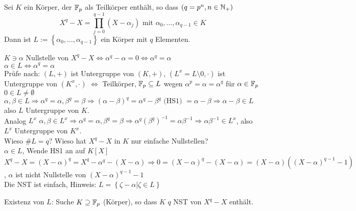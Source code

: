 \documentclass[a4paper,twoside,DIV15,BCOR12mm]{scrbook}
\begin{document}
\begin{hilfssatz}[2]
Sei $K$ ein Körper, der $\mathbb{F}_p$ als Teilkörper enthält, so dass $(q=p^n, n\in\mathbb{N}_+)$
$$X^q-X = \prod_{j=0}^{q-1}(X-\alpha_j) \mbox{ mit } \alpha_0,\dotsc,\alpha_{q-1} \in K$$
Dann ist $L:= \left\{\alpha_0,\dotsc,\alpha_{q-1}\right\}$ ein Körper mit $q$ Elementen.
\end{hilfssatz}
\begin{beweis}
$K \ni \alpha$ Nullstelle von $X^q-X \Leftrightarrow \alpha^q-\alpha=0 \Leftrightarrow \alpha^q=\alpha$ \\
$\alpha \in L \Leftrightarrow \alpha^q = \alpha$ \\
Prüfe nach: $(L,+)$ ist Untergruppe von $(K,+)$, $(L^x=L\setminus 0,\cdot)$ ist Untergruppe von $(K^x,\cdot)$ $\Leftrightarrow$ Teilkörper, $\mathbb{F}_p \subseteq L$ wegen $\alpha^p = \alpha = \alpha^q$ für $\alpha \in \mathbb{F}_p$\\
$0 \in L \neq \emptyset$ \\
$\alpha,\beta \in L \Rightarrow \alpha^q = \alpha, \beta^q = \beta \Rightarrow (\alpha-\beta)^q = \alpha^q - \beta^q \mbox{ (HS1) } = \alpha - \beta \Rightarrow \alpha - \beta \in L$ also $L$ Untergruppe von $K$.\\
Analog $L^x$ $\alpha,\beta \in L^x \Rightarrow \alpha^q = \alpha, \beta^q=\beta \Rightarrow \alpha^q(\beta^q)^{-1} = \alpha\beta^{-1} \Rightarrow \alpha\beta^{-1} \in L^x$, also $L^x$ Untergruppe von $K^x$. \\
Wieso $\#L=q$? Wieso hat $X^q-X$ in $K$ nur einfache Nullstellen? \\
$\alpha \in L$, Wende HS1 an auf $K[X]$\\
$X^q-X=(X-\alpha)^q=X^q-\alpha^q-(X-\alpha) \Rightarrow 0 = (X-\alpha)^q - (X-\alpha) = (X-\alpha)\left((X-\alpha)^{q-1}-1\right)$, $\alpha$ ist nicht Nullstelle von $(X-\alpha)^{q-1}-1$ \\
Die NST ist einfach, Hinweis: $L = \left\{\zeta-\alpha|\zeta \in L\right\}$
\end{beweis}

Existenz von $L$: Suche $K \supseteq \mathbb{F}_p$ (Körper), so dass $K$ $q$ NST von $X^q-X$ enthält.
\end{document}
